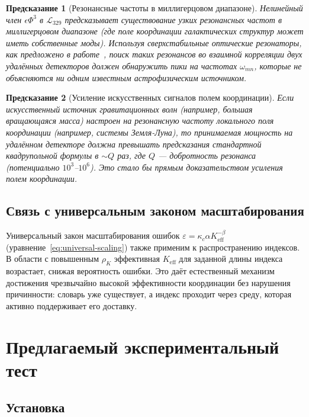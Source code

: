 \documentclass[12pt,a4paper]{article}
\newcommand{\Keff}{K_{\mathrm{eff}}}
\newcommand{\kappac}{\kappa_c}
\newcommand{\eps}{\varepsilon}
\newtheorem{prediction}{Предсказание}
\begin{document}
	\begin{prediction}[Резонансные частоты в миллигерцовом диапазоне]
		Нелинейный член \(\epsilon \Phi^3\) в \(\mathcal{L}_{329}\) предсказывает существование узких резонансных частот в миллигерцовом диапазоне (где поле координации галактических структур может иметь собственные моды). Используя сверхстабильные оптические резонаторы, как предложено в работе~\cite{Barontini2025}, поиск таких резонансов во взаимной корреляции двух удалённых детекторов должен обнаружить пики на частотах \(\omega_{mn}\), которые не объясняются ни одним известным астрофизическим источником.
	\end{prediction}
	
	\begin{prediction}[Усиление искусственных сигналов полем координации]
		Если искусственный источник гравитационных волн (например, большая вращающаяся масса) настроен на резонансную частоту локального поля координации (например, системы Земля-Луна), то принимаемая мощность на удалённом детекторе должна превышать предсказания стандартной квадрупольной формулы в \(\sim Q\) раз, где \(Q\) — добротность резонанса (потенциально \(10^3\)–\(10^6\)). Это стало бы прямым доказательством усиления полем координации.
	\end{prediction}
	
	\subsection{Связь с универсальным законом масштабирования}
	
	Универсальный закон масштабирования ошибок \(\eps = \kappac\alpha\Keff^{-\beta}\) (уравнение~\ref{eq:universal-scaling}) также применим к распространению индексов. В области с повышенным \(\rho_K\) эффективная \(\Keff\) для заданной длины индекса возрастает, снижая вероятность ошибки. Это даёт естественный механизм достижения чрезвычайно высокой эффективности координации без нарушения причинности: словарь уже существует, а индекс проходит через среду, которая активно поддерживает его доставку.
	
	\section{Предлагаемый экспериментальный тест}
	\label{sec:experiment}
	
	\subsection{Установка}
	
\end{document}
